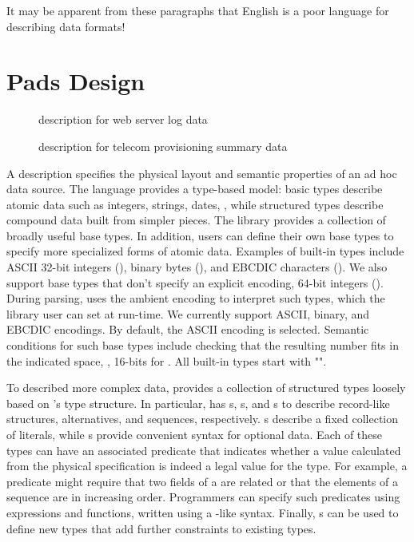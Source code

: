 \documentclass{sig-alternate}
\begin{document}
It may be apparent from these paragraphs that English is a poor
language for describing data formats!


\section{Pads Design}
\begin{figure}

\caption{\pads{} description for web server log data}
\label{figure:wsl}
\end{figure}

\begin{figure}

\caption{\pads{} description for telecom provisioning summary data}
\label{figure:dibbler}
\end{figure}


A \pads{} description specifies the physical layout and 
semantic properties of an ad hoc data source. 
The language provides a type-based model:
basic types describe atomic data such as integers, strings, dates, \etc{}, while
structured types describe compound data built from simpler pieces.
The \pads{} library provides a collection of broadly useful base types.
In addition,  users can define their own base types to specify more
specialized forms of atomic data.  Examples of built-in types include
ASCII 32-bit integers (), binary bytes (), and
EBCDIC characters ().  
We also support base types that don't specify an explicit encoding, 
\eg{} 64-bit integers ().  
During parsing, \pads{} uses the ambient encoding to interpret such
types, which the library user can set at run-time.  
We currently support ASCII, binary, and EBCDIC encodings.  
By default, the ASCII encoding is selected.
Semantic conditions for such base types include checking that the
resulting number fits in the indicated space, \ie, 16-bits for
.  All built-in \pads{} types start with "".

To described more complex data, \pads{} provides a collection of 
structured types loosely based on \C{}'s type structure.
In particular, \pads{} has 
s, s, and s to describe
record-like structures, alternatives, and sequences, respectively.
s describe a fixed collection of literals, while s 
provide convenient syntax for optional data.
Each of these
types can have an associated predicate that indicates whether a
value calculated from the physical specification is indeed a legal
value for the type.  For example, a predicate might require that two
fields of a  are related or that the elements
of a sequence are in increasing order.  Programmers can specify such
predicates using \pads{} expressions and functions, 
written using a \C{}-like syntax.
Finally, \pads{} s can be used
to define new types that add further constraints to existing types.
\end{document}
